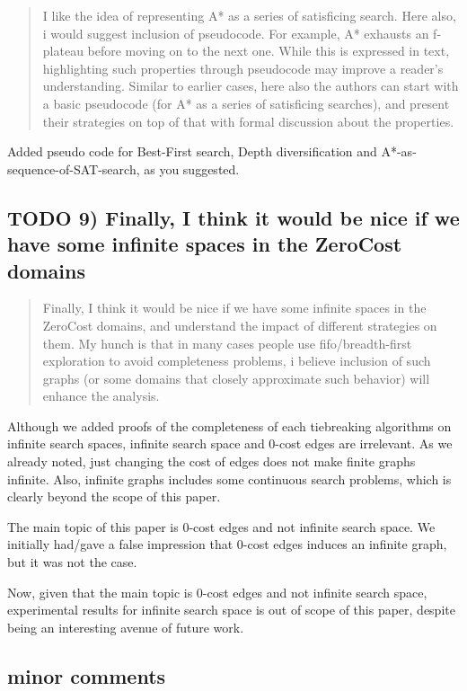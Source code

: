 \documentclass{article}
\begin{document}
\begin{quote}
 I like the idea of representing A* as a series of satisficing
search. Here also, i would suggest inclusion of pseudocode. For
example, A* exhausts an f-plateau before moving on to the next one.
While this is expressed in text, highlighting such properties through
pseudocode may improve a reader's understanding. Similar to earlier
cases, here also the authors can start with a basic pseudocode (for A*
as a series of satisficing searches), and present their strategies on
top of that with formal discussion about the properties.
\end{quote}

Added pseudo code for Best-First search, Depth diversification and A*-as-sequence-of-SAT-search,
as you suggested.

\subsection{{\bfseries\sffamily TODO} 9) Finally, I think it would be nice if we have some infinite spaces in the ZeroCost domains}
\label{sec:orgheadline22}

\begin{quote}
 Finally, I think it would be nice if we have some infinite spaces
in the ZeroCost domains, and understand the impact of different
strategies on them. My hunch is that in many cases people use
fifo/breadth-first exploration to avoid completeness problems, i
believe inclusion of such graphs (or some domains that closely
approximate such behavior) will enhance the analysis.
\end{quote}

Although we added proofs of the completeness of each tiebreaking algorithms
on infinite search spaces, infinite search space and 0-cost edges are irrelevant.
As we already noted,
just changing the cost of edges does not make finite graphs infinite.
Also, infinite graphs includes some continuous search problems,
which is clearly beyond the scope of this paper.

The main topic of this paper is 0-cost edges and not infinite search space.
We initially had/gave a false impression that 0-cost edges induces an infinite graph,
but it was not the case.

Now, given that the main topic is 0-cost edges and not infinite search space,
experimental results for infinite search space is out of scope of this paper,
despite being an interesting avenue of future work.

\subsection{minor comments}
\label{sec:orgheadline23}
\end{document}
